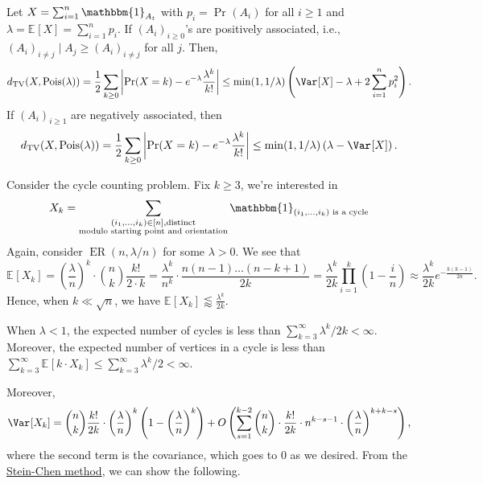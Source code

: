 \begin{theorem}\label{thm:Stein-Chen-method}
	Let \(X = \sum_{i=1}^{n} \mathbbm{1}_{A_t} \) with \(p_i = \Pr_{}(A_i) \) for all \(i \geq 1\) and \(\lambda = \mathbb{E}_{}[X] = \sum_{i=1}^{n} p_i\). If \((A_i)_{i \geq 0}\)'s are positively associated, i.e., \((A_i)_{i \neq j} \mid A_j \geq (A_i)_{i \neq j}\) for all \(j\). Then,
	\[
		d_{\mathrm{TV} }(X, \operatorname{Pois}(\lambda ) )
		= \frac{1}{2} \sum_{k \geq 0} \left\lvert \Pr_{}(X = k) - e^{-\lambda } \frac{\lambda ^k }{k!}  \right\rvert
		\leq \min ( 1, 1 / \lambda ) \left( \Var_{}[X] - \lambda + 2 \sum_{i=1}^{n} p_i^2 \right).
	\]
	If \((A_i)_{i\geq 1}\) are negatively associated, then
	\[
		d_{\mathrm{TV} }(X, \operatorname{Pois}(\lambda ) )
		= \frac{1}{2} \sum_{k \geq 0} \left\lvert \Pr_{}(X = k) - e^{-\lambda } \frac{\lambda ^k }{k!}  \right\rvert
		\leq \min ( 1, 1 / \lambda ) \left( \lambda - \Var_{}[X] \right).
	\]
\end{theorem}

Consider the cycle counting problem. Fix \(k \geq 3\), we're interested in
\[
	X_k = \sum_{\substack{(i_1, \dots , i_k) \in [n], \text{distinct} \\ \text{modulo starting point and orientation} }} \mathbbm{1}_{(i_1, \dots , i_k) \text{ is a cycle} }
\]
Again, consider \(\operatorname{ER}(n, \lambda / n) \) for some \(\lambda > 0\). We see that
\[
	\mathbb{E}_{}[X_k]
	= \left( \frac{\lambda}{n} \right) ^k \cdot \binom{n}{k} \frac{k!}{2 \cdot k}
	= \frac{\lambda ^k}{n^k} \cdot \frac{n(n-1) \dots (n-k+1)}{2k}
	= \frac{\lambda ^k}{2k} \prod_{i=1}^{k} \left( 1 - \frac{i}{n} \right)
	\approx \frac{\lambda ^k}{2k} e^{- \frac{k (k-1)}{2n}}.
\]
Hence, when \(k \ll \sqrt{n} \), we have \(\mathbb{E}_{}[X_k] \lessapprox \frac{\lambda ^k}{2k}\).

\begin{corollary}
	When \(\lambda < 1\), the expected number of cycles is less than \(\sum_{k=3}^{\infty} \lambda ^k / 2k < \infty \). Moreover, the expected number of vertices in a cycle is less than \(\sum_{k=3}^{\infty} \mathbb{E}_{}[k \cdot X_k] \leq \sum_{k=3}^{\infty} \lambda ^k / 2 < \infty \).
\end{corollary}

Moreover,
\[
	\Var_{}[X_k]
	= \binom{n}{k} \frac{k!}{2k} \cdot \left( \frac{\lambda}{n} \right) ^k \left( 1 - \left( \frac{\lambda}{n} \right) ^k \right) + O\left( \sum_{s=1}^{k-2} \binom{n}{k} \cdot \frac{k!}{2k} \cdot n^{k - s - 1} \cdot \left( \frac{\lambda}{n} \right)^{k + k - s} \right),
\]
where the second term is the covariance, which goes to \(0\) as we desired. From the \hyperref[thm:Stein-Chen-method]{Stein-Chen method}, we can show the following.

